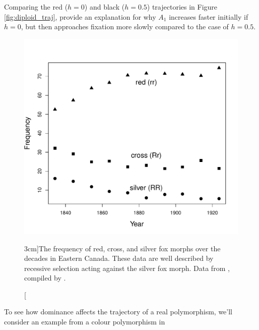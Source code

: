 \begin{question}{}
Comparing the red ($h=0$) and black ($h=0.5$) trajectories in Figure \ref{fig:diploid_traj}, provide an explanation for why $A_1$ increases faster initially if $h=0$, but then approaches fixation more slowly compared to the case of $h=0.5$.
\end{question}



\begin{figure}
\begin{center}
  \includegraphics[width = 0.8 \textwidth]{Journal_figs/single_locus_selection/silver_fox/fox_morph_freqs.pdf}
\end{center}
\caption[][3cm]{The frequency of red, cross, and silver fox morphs over the
  decades in Eastern Canada. These data are well described by
  recessive selection acting against the silver fox morph. Data from
  \citet{elton:42}, compiled by \citet{Allendorf:09}. } \label{fig:Fox_morph_freqs}
\end{figure}
To see how dominance affects the trajectory of a real
polymorphism, we'll consider an example from a colour polymorphism in
